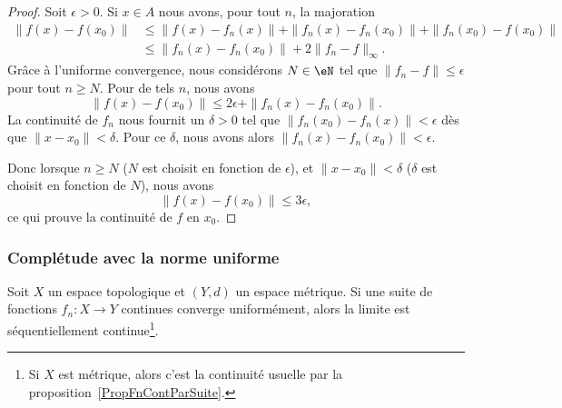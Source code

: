 \begin{proof}
	Soit \( \epsilon>0\). Si \( x\in A\) nous avons, pour tout \( n\), la majoration
	\begin{subequations}
		\begin{align}
			\| f(x)-f(x_0) \| & \leq \| f(x)-f_n(x) \|+\| f_n(x)-f_n(x_0) \|+\| f_n(x_0)-f(x_0) \| \\
			                  & \leq\| f_n(x)-f_n(x_0) \|+2\| f_n-f \|_{\infty}.
		\end{align}
	\end{subequations}
	Grâce à l'uniforme convergence, nous considérons \(N\in \eN\) tel que \( \| f_n-f \|\leq \epsilon\) pour tout \( n\geq N\). Pour de tels \( n\), nous avons
	\begin{equation}
		\| f(x)-f(x_0) \|\leq 2\epsilon+\| f_n(x)-f_n(x_0) \|.
	\end{equation}
	La continuité de \( f_n\) nous fournit un \( \delta>0\) tel que \( \| f_n(x_0)-f_n(x) \|<\epsilon\) dès que \( \| x-x_0 \|<\delta\). Pour ce \( \delta\), nous avons alors \( \| f_n(x)-f_n(x_0) \|<\epsilon\).

    Donc lorsque \( n\geq N\) (\( N\) est choisit en fonction de \( \epsilon\)), et \( \| x-x_0 \|<\delta\) (\( \delta\) est choisit en fonction de \( N\)), nous avons
	\begin{equation}
		\| f(x)-f(x_0) \|\leq 3\epsilon,
	\end{equation}
	ce qui prouve la continuité de \( f\) en \( x_0\).
\end{proof}

\subsubsection{Complétude avec la norme uniforme}

\begin{proposition}\label{PropCZslHBx}
	Soit \( X\) un espace topologique et \( (Y,d)\) un espace métrique. Si une suite de fonctions \( f_n\colon X\to Y\) continues converge uniformément, alors la limite est séquentiellement continue\footnote{Si \( X\) est métrique, alors c'est la continuité usuelle par la proposition~\ref{PropFnContParSuite}.}.
\end{proposition}

